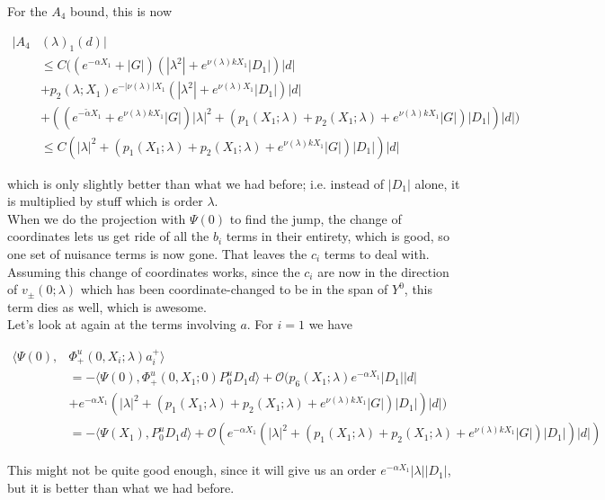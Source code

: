\documentclass[12pt]{article}
\begin{document}
\begin{enumerate}
For the $A_4$ bound, this is now

\begin{align*}
|A_4&(\lambda)_1(d)| \\
&\leq C( (e^{-\alpha X_1} + |G|) (|\lambda^2| + e^{\nu(\lambda)k X_1}|D_1|)|d| \\ 
&+ p_2(\lambda; X_1) e^{-|\nu(\lambda)| X_1} (|\lambda^2| + e^{\nu(\lambda)X_1}|D_1|)|d| \\
&+ ((e^{-\tilde{\alpha} X_1} + e^{\nu(\lambda)k X_1} |G|) |\lambda|^2 + (p_1(X_1; \lambda) + p_2(X_1; \lambda) + e^{\nu(\lambda) k X_1} |G|)|D_1|)|d| )\\
&\leq C(|\lambda|^2 + (p_1(X_1; \lambda) + p_2(X_1; \lambda) + e^{\nu(\lambda) k X_1} |G|)|D_1|) |d|
\end{align*}

which is only slightly better than what we had before; i.e. instead of $|D_1|$ alone, it is multiplied by stuff which is order $\lambda$.\\

When we do the projection with $\Psi(0)$ to find the jump, the change of coordinates lets us get ride of all the $b_i$ terms in their entirety, which is good, so one set of nuisance terms is now gone. That leaves the $c_i$ terms to deal with. Assuming this change of coordinates works, since the $c_i$ are now in the direction of $v_\pm(0; \lambda)$ which has been coordinate-changed to be in the span of $Y^0$, this term dies as well, which is awesome. \\

Let's look at again at the terms involving $a$. For $i = 1$ we have

\begin{align*}
\langle \Psi(0), &\Phi^u_+(0, X_i; \lambda) a_i^+ \rangle \\
&= -\langle \Psi(0), \Phi^u_+(0, X_1; 0) P^u_0 D_1 d \rangle + \mathcal{O}( p_6(X_1; \lambda) e^{-\alpha X_1}|D_1||d| \\
&+ e^{-\alpha X_1} (|\lambda|^2 + (p_1(X_1; \lambda) + p_2(X_1; \lambda) + e^{\nu(\lambda) k X_1} |G|)|D_1|) |d|) \\
&= -\langle \Psi(X_1), P^u_0 D_1 d \rangle + \mathcal{O}( e^{-\alpha X_1}( |\lambda|^2 + (p_1(X_1; \lambda) + p_2(X_1; \lambda) + e^{\nu(\lambda) k X_1} |G|)|D_1|)|d|)
\end{align*}

This might not be quite good enough, since it will give us an order $e^{-\alpha X_1} |\lambda||D_1|$, but it is better than what we had before.\\


\end{enumerate}
\end{document}

